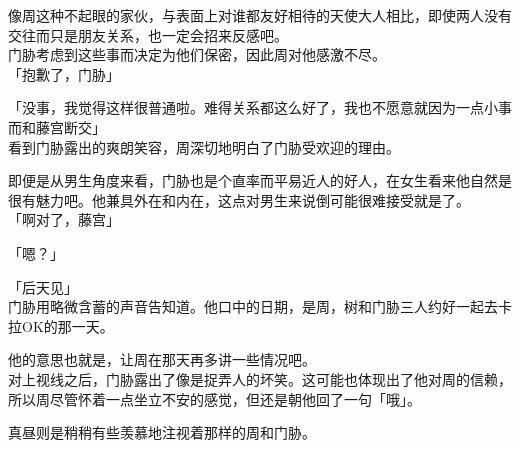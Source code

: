 像周这种不起眼的家伙，与表面上对谁都友好相待的天使大人相比，即使两人没有交往而只是朋友关系，也一定会招来反感吧。\\

门胁考虑到这些事而决定为他们保密，因此周对他感激不尽。\\

「抱歉了，门胁」

「没事，我觉得这样很普通啦。难得关系都这么好了，我也不愿意就因为一点小事而和藤宫断交」\\

看到门胁露出的爽朗笑容，周深切地明白了门胁受欢迎的理由。

即便是从男生角度来看，门胁也是个直率而平易近人的好人，在女生看来他自然是很有魅力吧。他兼具外在和内在，这点对男生来说倒可能很难接受就是了。\\

「啊对了，藤宫」

「嗯？」

「后天见」\\

门胁用略微含蓄的声音告知道。他口中的日期，是周，树和门胁三人约好一起去卡拉OK的那一天。

他的意思也就是，让周在那天再多讲一些情况吧。\\

对上视线之后，门胁露出了像是捉弄人的坏笑。这可能也体现出了他对周的信赖，所以周尽管怀着一点坐立不安的感觉，但还是朝他回了一句「哦」。

真昼则是稍稍有些羡慕地注视着那样的周和门胁。

